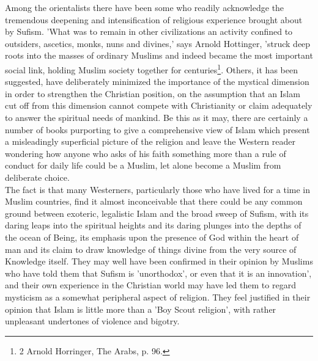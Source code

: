 \documentclass[11pt, b5paper, twoside]{book}
\begin{document}
Among the orientalists there have been some who readily acknowledge the tremendous deepening and 
intensification of religious experience brought about by Sufism. 'What was to remain in other 
civilizations an activity confined to outsiders, ascetics, monks, nuns and divines,' says Arnold 
Hottinger, 'struck deep roots into the masses of ordinary Muslims and indeed became the most 
important social link, holding Muslim society together for centuries\footnote{2 Arnold Horringer, The Arabs, p. 96.}. Others, it has been 
suggested, have deliberately minimized the importance of the mystical dimension in order to 
strengthen the Christian position, on the assumption that an Islam cut off from this dimension cannot 
compete with Christianity or claim adequately to answer the spiritual needs of mankind. Be this as it 
may, there are certainly a number of books purporting to give a comprehensive view of Islam which 
present a misleadingly superficial picture of the religion and leave the Western reader wondering how 
anyone who asks of his faith something more than a rule of conduct for daily life could be a Muslim, 
let alone become a Muslim from deliberate choice. \\

The fact is that many Westerners, particularly those who have lived for a time in Muslim countries, 
find it almost inconceivable that there could be any common ground between exoteric, legalistic Islam 
and the broad sweep of Sufism, with its daring leaps into the spiritual heights and its daring 
plunges into the depths of the ocean of Being, its emphasis upon the presence of God within the heart 
of man and its claim to draw knowledge of things divine from the very source of Knowledge itself. 
They may well have been confirmed in their opinion by Muslims who have told them that Sufism is 
'unorthodox', or even that it is an innovation', and their own experience in the Christian world may 
have led them to regard mysticism as a somewhat peripheral aspect of religion. They feel justified in 
their opinion that Islam is little more than a 'Boy Scout religion', with rather unpleasant 
undertones of violence and bigotry. \\
\end{document}

